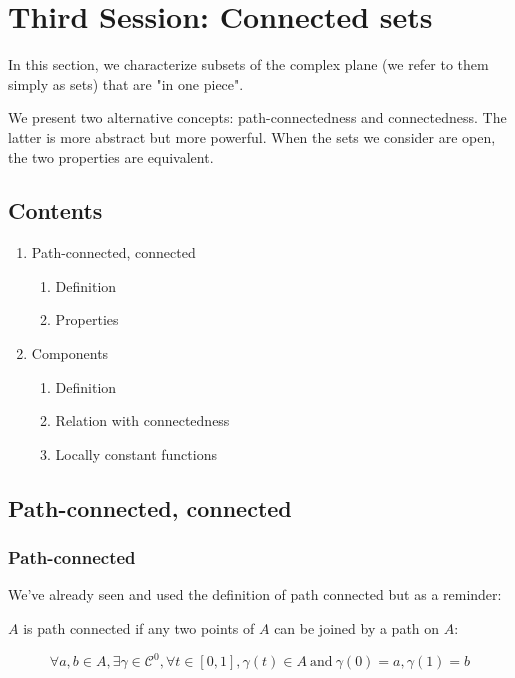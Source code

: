 \section{Third Session: Connected sets}
In this section, we characterize subsets of the complex plane (we refer to them simply as sets) that are "in one piece".

We present two alternative concepts: path-connectedness and connectedness. The latter is more abstract but more powerful. When the sets we consider are open, the two properties are equivalent.

\subsection*{Contents}
\begin{enumerate}
    \item Path-connected, connected
        \begin{enumerate}
            \item Definition
            \item Properties 
        \end{enumerate}
    \item Components
        \begin{enumerate}
            \item Definition
            \item Relation with connectedness
            \item Locally constant functions
        \end{enumerate}
\end{enumerate}

\subsection{Path-connected, connected}

\subsubsection{Path-connected}
We've already seen and used the definition of path connected but as a reminder:
\begin{defi}
   $A$ is path connected if any two points of $A$ can be joined by a path on $A$:

   $$\forall a,b\in A, \exists \gamma\in\mathcal{C}^0, \forall t\in[0,1], \gamma(t)\in A~\mathrm{ and}~\gamma(0) = a, \gamma(1) = b$$
\end{defi}

